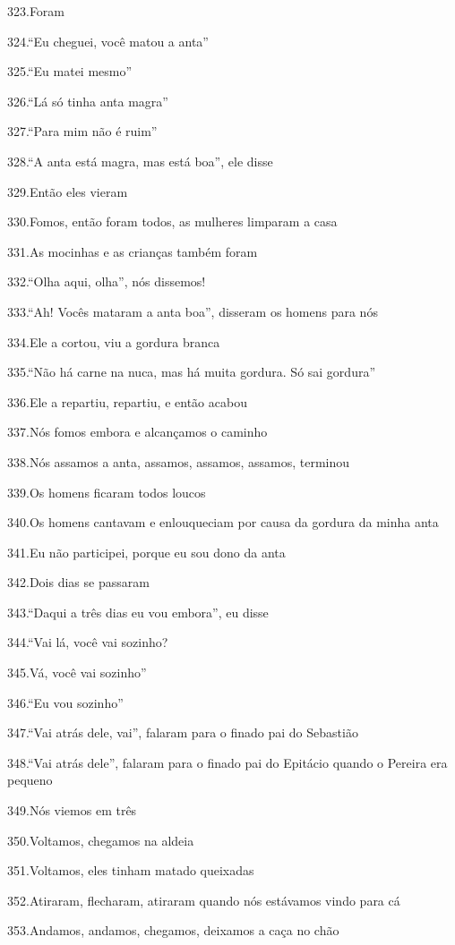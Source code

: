 323.Foram

324.``Eu cheguei, você matou a anta''

325.``Eu matei mesmo''

326.``Lá só tinha anta magra''

327.``Para mim não é ruim''

328.``A anta está magra, mas está boa'', ele disse

329.Então eles vieram

330.Fomos, então foram todos, as mulheres limparam a casa

331.As mocinhas e as crianças também foram

332.``Olha aqui, olha'', nós dissemos!

333.``Ah! Vocês mataram a anta boa'', disseram os homens para nós

334.Ele a cortou, viu a gordura branca

335.``Não há carne na nuca, mas há muita gordura. Só sai gordura''

336.Ele a repartiu, repartiu, e então acabou

337.Nós fomos embora e alcançamos o caminho

338.Nós assamos a anta, assamos, assamos, assamos, terminou

339.Os homens ficaram todos loucos

340.Os homens cantavam e enlouqueciam por causa da gordura da minha anta

341.Eu não participei, porque eu sou dono da anta

342.Dois dias se passaram

343.``Daqui a três dias eu vou embora'', eu disse

344.``Vai lá, você vai sozinho?

345.Vá, você vai sozinho''

346.``Eu vou sozinho''

347.``Vai atrás dele, vai'', falaram para o finado pai do Sebastião

348.``Vai atrás dele'', falaram para o finado pai do Epitácio quando o
Pereira era pequeno

349.Nós viemos em três

350.Voltamos, chegamos na aldeia

351.Voltamos, eles tinham matado queixadas

352.Atiraram, flecharam, atiraram quando nós estávamos vindo para cá

353.Andamos, andamos, chegamos, deixamos a caça no chão

